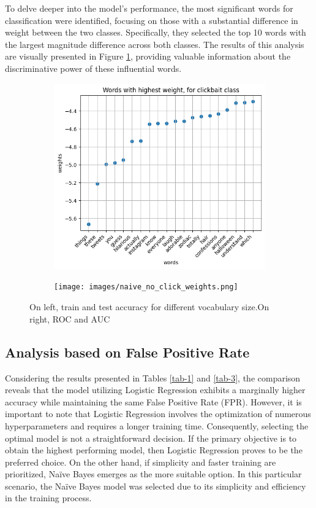 \documentclass{class}
\begin{document}
To delve deeper into the model's performance, the most significant words for classification were identified,
focusing on those with a substantial difference in weight between the two classes.
Specifically, they selected the top 10 words with the largest magnitude difference across both classes.
The results of this analysis are visually presented in Figure \ref{fig-13},
providing valuable information about the discriminative power of these influential words.
\begin{figure}[h]
    \begin{subfigure}{.5\linewidth}
        \includegraphics[width=\linewidth]{images/naive_click_weights.png}
    \end{subfigure}%
    \begin{subfigure}{.5\linewidth}
        \texttt{[image: images/naive\_no\_click\_weights.png]}
    \end{subfigure}
    \caption{On left, train and test accuracy for different vocabulary size.On right, ROC and AUC}
    \label{fig-13}
\end{figure}

\subsection{Analysis based on False Positive Rate}
Considering the results presented in Tables \ref{tab-1} and \ref{tab-3}, the comparison reveals that
the model utilizing Logistic Regression exhibits a marginally higher accuracy while maintaining the same False Positive Rate (FPR).
However, it is important to note that Logistic Regression involves the optimization of numerous hyperparameters and requires a longer training time.
Consequently, selecting the optimal model is not a straightforward decision. If the primary objective is to obtain the highest performing model,
then Logistic Regression proves to be the preferred choice.
On the other hand, if simplicity and faster training are prioritized,
Na\"ive Bayes emerges as the more suitable option. In this particular scenario, the Na\"ive Bayes model was selected due to its simplicity and efficiency
in the training process.
\end{document}
